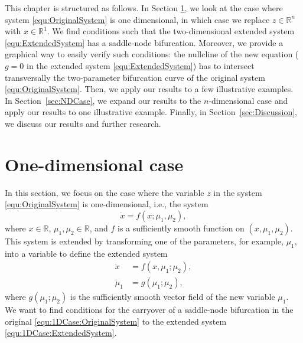 \documentclass[12pt]{article}
\begin{document}
This chapter is structured as follows. In Section \ref{sec:1DCase}, we look at the case where system \eqref{equ:OriginalSystem} is one dimensional, in which case we replace $z\in\mathbb{R}^{n}$ with $x\in\mathbb{R}^{1}$. We find conditions such that the two-dimensional extended system \eqref{equ:ExtendedSystem} has a saddle-node bifurcation. Moreover, we provide a graphical way to easily verify such conditions: the nullcline of the new equation ($g=0$ in the extended system \eqref{equ:ExtendedSystem}) has to intersect transversally the two-parameter bifurcation curve of the original system \eqref{equ:OriginalSystem}. Then, we apply our results to a few illustrative examples. In Section~\ref{sec:NDCase}, we expand our results to the $n$-dimensional case and apply our results to one illustrative example. Finally, in Section~\ref{sec:Discussion}, we discuss our results and further research.


\section{One-dimensional case}
\label{sec:1DCase}


In this section, we focus on the case where the variable $z$ in the system \eqref{equ:OriginalSystem} is one-dimensional, i.e., the system
\begin{equation}
    \dot x = f(x;\mu_{1},\mu_{2}),
    \label{equ:1DCase:OriginalSystem}
\end{equation}
where $x\in\mathbb{R}$, $\mu_{1},\mu_{2}\in\mathbb{R}$, and $f$ is a sufficiently smooth function on $(x,\mu_{1},\mu_{2})$. This system is extended by transforming one of the parameters, for example, $\mu_{1}$, into a variable to define the extended system
\begin{equation}
    \left. \begin{aligned}
    \dot x &= f(x,\mu_{1}; \mu_{2}), \\
    \dot \mu_{1} &= g(\mu_{1}; \mu_{2}),
    \end{aligned}\right.
    \label{equ:1DCase:ExtendedSystem}
\end{equation}
where $g(\mu_{1}; \mu_{2})$ is the sufficiently smooth vector field of the new variable $\mu_{1}$. We want to find conditions for the carryover of a saddle-node bifurcation in the original \eqref{equ:1DCase:OriginalSystem} to the extended system \eqref{equ:1DCase:ExtendedSystem}.
\end{document}
